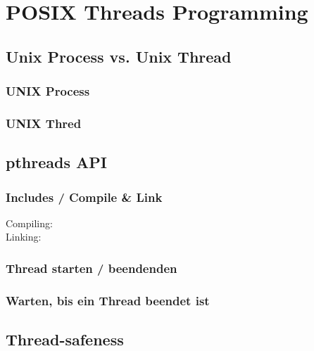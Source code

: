 \section{POSIX Threads Programming}



\subsection{Unix Process vs. Unix Thread}


\subsubsection{UNIX Process}


\subsubsection{UNIX Thred}


\subsection{pthreads API}

\subsubsection{Includes / Compile \& Link}



\begin{description}
    \item[Compiling:] 
    \item[Linking:] 
\end{description}


\subsubsection{Thread starten / beendenden}


\subsubsection{Warten, bis ein Thread beendet ist}


\subsection{Thread-safeness}